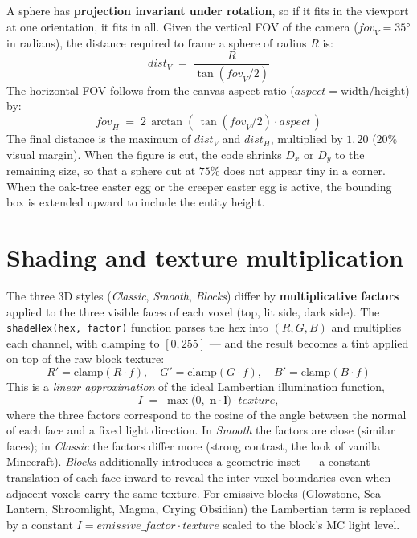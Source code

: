 \documentclass[12pt,a4paper]{scrartcl}
\newcommand{\code}[1]{\texttt{\small #1}}
\newcommand{\acc}[1]{\textcolor{accent}{\textbf{#1}}}
\begin{document}
A sphere has \acc{projection invariant under rotation}, so if it fits in the viewport at one orientation, it fits in all. Given the vertical FOV of the camera ($\mathit{fov}_V = 35°$ in radians), the distance required to frame a sphere of radius $R$ is:
\[
\mathit{dist}_V \;=\; \dfrac{R}{\tan(\mathit{fov}_V / 2)}
\]
The horizontal FOV follows from the canvas aspect ratio ($\mathit{aspect} = \text{width}/\text{height}$) by:
\[
\mathit{fov}_H \;=\; 2\,\arctan\!\left(\,\tan(\mathit{fov}_V/2)\cdot \mathit{aspect}\,\right)
\]
The final distance is the maximum of $\mathit{dist}_V$ and $\mathit{dist}_H$, multiplied by $1{,}20$ ($20\%$ visual margin). When the figure is cut, the code shrinks $D_x$ or $D_y$ to the remaining size, so that a sphere cut at $75\%$ does not appear tiny in a corner. When the oak-tree easter egg or the creeper easter egg is active, the bounding box is extended upward to include the entity height.

\section{Shading and texture multiplication}

The three 3D styles (\emph{Classic}, \emph{Smooth}, \emph{Blocks}) differ by \acc{multiplicative factors} applied to the three visible faces of each voxel (top, lit side, dark side). The \code{shadeHex(hex, factor)} function parses the hex into $(R,G,B)$ and multiplies each channel, with clamping to $[0, 255]$ --- and the result becomes a tint applied on top of the raw block texture:
\[
R' = \mathrm{clamp}(R \cdot f),\quad
G' = \mathrm{clamp}(G \cdot f),\quad
B' = \mathrm{clamp}(B \cdot f)
\]
This is a \emph{linear approximation} of the ideal Lambertian illumination function,
\[
I \;=\; \max\bigl(0,\;\mathbf{n}\cdot\mathbf{l}\bigr)\cdot \mathit{texture},
\]
where the three factors correspond to the cosine of the angle between the normal of each face and a fixed light direction. In \emph{Smooth} the factors are close (similar faces); in \emph{Classic} the factors differ more (strong contrast, the look of vanilla Minecraft). \emph{Blocks} additionally introduces a geometric inset --- a constant translation of each face inward to reveal the inter-voxel boundaries even when adjacent voxels carry the same texture. For emissive blocks (Glowstone, Sea Lantern, Shroomlight, Magma, Crying Obsidian) the Lambertian term is replaced by a constant $I = \mathit{emissive\_factor} \cdot \mathit{texture}$ scaled to the block's MC light level.
\end{document}
